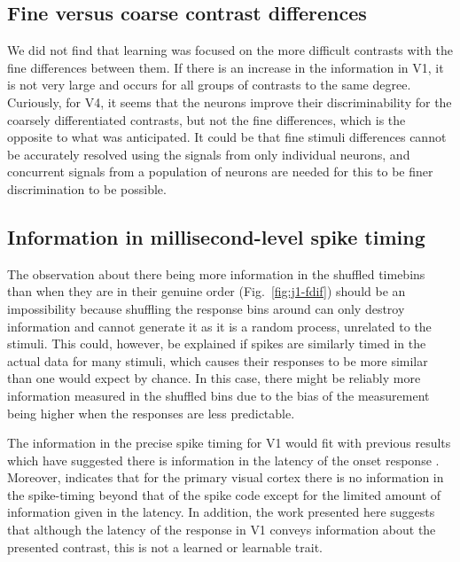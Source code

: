 \subsection{Fine versus coarse contrast differences}

We did not find that learning was focused on the more difficult contrasts with the fine differences between them.
If there is an increase in the information in \ac{V1}, it is not very large and occurs for all groups of contrasts to the same degree.
Curiously, for \ac{V4}, it seems that the neurons improve their discriminability for the coarsely differentiated contrasts, but not the fine differences, which is the opposite to what was anticipated.
It could be that fine stimuli differences cannot be accurately resolved using the signals from only individual neurons, and concurrent signals from a population of neurons are needed for this to be finer discrimination to be possible.

\subsection{Information in millisecond-level spike timing}

The observation about there being more information in the shuffled timebins than when they are in their genuine order (Fig.~\ref{fig:j1-fdif}) should be an impossibility because shuffling the response bins around can only destroy information and cannot generate it as it is a random process, unrelated to the stimuli.
This could, however, be explained if spikes are similarly timed in the actual data for many stimuli, which causes their responses to be more similar than one would expect by chance.
In this case, there might be reliably more information measured in the shuffled bins due to the bias of the measurement being higher when the responses are less predictable.

The information in the precise spike timing for \ac{V1} would fit with previous results which have suggested there is information in the latency of the onset response
\cite{Reich2001,Tovee1993,Rolls2011}.
Moreover, \cite{Tovee1993,Rolls2011} indicates that for the primary visual cortex there is no information in the spike-timing beyond that of the spike code except for the limited amount of information given in the latency.
In addition, the work presented here suggests that although the latency of the response in \ac{V1} conveys information about the presented contrast, this is not a learned or learnable trait.


